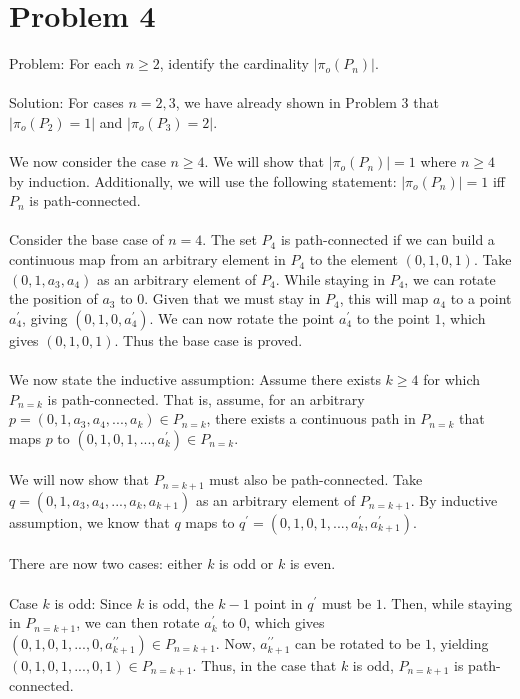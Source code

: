 \documentclass{article}
\begin{document}
\section*{Problem 4}
Problem: For each $n \geq 2$, identify the cardinality $| \pi_o (P_n) |$. \\\\
Solution: For cases $n = 2,3$, we have already shown in Problem 3 that
$| \pi_o (P_2) = 1 |$ and $| \pi_o (P_3) = 2 |$. \\\\
We now consider the case $n \geq 4$.
We will show that $| \pi_o (P_n) | = 1$ where $n \geq 4$ by induction.
Additionally, we will use the following statement: $| \pi_o (P_n) | = 1$ iff $P_n$ is path-connected. \\\\
Consider the base case of $n = 4$. The set $P_4$ is path-connected if we can build a continuous map from an arbitrary element in $P_4$ to the element $(0,1,0,1)$.
Take $(0,1,a_3,a_4)$ as an arbitrary element of $P_4$. While staying in $P_4$, we can rotate the position of $a_3$ to $0$. Given that we must stay in $P_4$, this will map $a_4$ to a point $a_4^\prime$, giving $(0,1,0,a_4^\prime)$.
We can now rotate the point $a_4^\prime$ to the point $1$, which gives $(0,1,0,1)$. Thus the base case is proved. \\\\
We now state the inductive assumption: Assume there exists $k \geq 4$ for which $P_{n = k}$ is path-connected. That is, assume, for an arbitrary $p = (0, 1, a_3, a_4, ... ,a_k) \in P_{n = k}$, there exists a continuous path in $P_{n = k}$ that maps $p$ to $(0,1,0,1, ... ,a^\prime _k) \in P_{n = k}$. \\\\
We will now show that $P_{n = k + 1}$ must also be path-connected. Take $q = (0,1,a_3, a_4, ... , a_k, a_{k+1})$ as an arbitrary element of $P_{n = k + 1}$. By inductive assumption, we know that $q$ maps to $q^\prime = (0,1,0,1,..., a^\prime _k, a^\prime _{k+1})$. \\\\
There are now two cases: either $k$ is odd or $k$ is even. \\\\
Case $k$ is odd: Since $k$ is odd, the $k-1$ point in $q^\prime$ must be $1$. Then, while staying in $P_{n = k + 1}$, we can then rotate $a^\prime _k$ to $0$, which gives
$(0,1,0,1,... ,0,a^{\prime \prime}_{k+1}) \in P_{n = k + 1}$.
Now, $a^{\prime \prime}_{k+1}$ can be rotated to be $1$, yielding $(0,1,0,1,...,0,1) \in P_{n = k + 1}$. Thus, in the case that $k$ is odd, $P_{n = k + 1}$ is path-connected. \\\\
\end{document}
